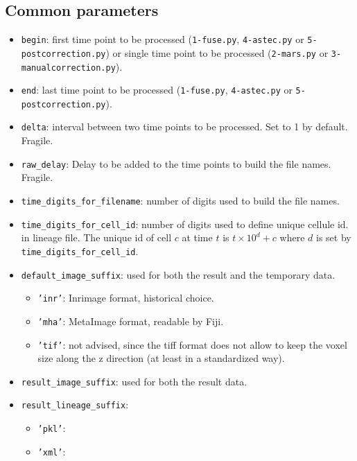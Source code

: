   

\subsection{Common parameters}
\label{sec:cli:parameters:common}

\begin{itemize}
\itemsep -0.5ex
\item \texttt{begin}:
  first time point to be processed (\texttt{1-fuse.py}, 
  \texttt{4-astec.py} or \texttt{5-postcorrection.py}) 
  or single time point to be processed
  (\texttt{2-mars.py} or \texttt{3-manualcorrection.py}).
\item \texttt{end}:
  last time point to be processed (\texttt{1-fuse.py}, 
  \texttt{4-astec.py} or \texttt{5-postcorrection.py}).
\item \texttt{delta}:
  interval between two time points to be processed. Set to 1 by default.
  Fragile.
\item \texttt{raw\_delay}:
  Delay to be added to the time points to build the file names. 
  Fragile.
\item \texttt{time\_digits\_for\_filename}:
  number of digits used to build the file names.
\item \texttt{time\_digits\_for\_cell\_id}:
  number of digits used to define unique cellule id. in lineage file.
  The unique id of cell $c$ at time $t$ is $t \times 10^d + c$ where
  $d$ is set by \texttt{time\_digits\_for\_cell\_id}.
\item \texttt{default\_image\_suffix}:
  used for both the result and the temporary data.
  \begin{itemize}
  \item \texttt{'inr'}: Inrimage format, historical choice.
  \item \texttt{'mha'}: MetaImage format, readable by Fiji.
  \item \texttt{'tif'}: not advised, since the tiff format does not allow
  to keep the voxel size along the z direction (at least in a 
  standardized way).
  \end{itemize}
\item \texttt{result\_image\_suffix}:
  used for both the result data.
\item \texttt{result\_lineage\_suffix}:
  \begin{itemize}
  \item \texttt{'pkl'}: 
  \item \texttt{'xml'}: 
  \end{itemize}
\end{itemize}


